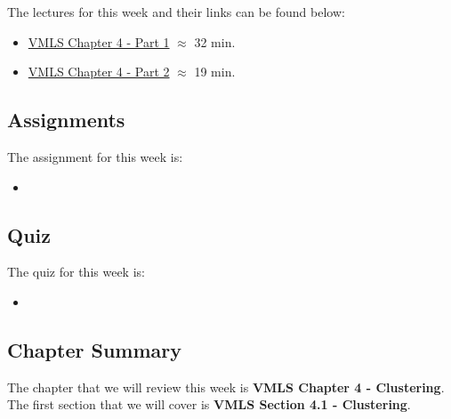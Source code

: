The lectures for this week and their links can be found below:

\begin{itemize}
    \item \href{https://www.youtube.com/watch?v=liaZ_SCuE1w&list=PLoROMvodv4rMz-WbFQtNUsUElIh2cPmN9&index=14}{VMLS Chapter 4 - Part 1} $\approx$ 32 min.
    \item \href{https://www.youtube.com/watch?v=a4GjONqojzM&list=PLoROMvodv4rMz-WbFQtNUsUElIh2cPmN9&index=15}{VMLS Chapter 4 - Part 2} $\approx$ 19 min.
\end{itemize}

\subsection{Assignments}

The assignment for this week is:

\begin{itemize}
    \item {}
\end{itemize}

\subsection{Quiz}

The quiz for this week is:

\begin{itemize}
    \item {}
\end{itemize}

\newpage

\subsection{Chapter Summary}

The chapter that we will review this week is \textbf{VMLS Chapter 4 - Clustering}. The first section that we will cover is \textbf{VMLS Section 4.1 - Clustering}.

